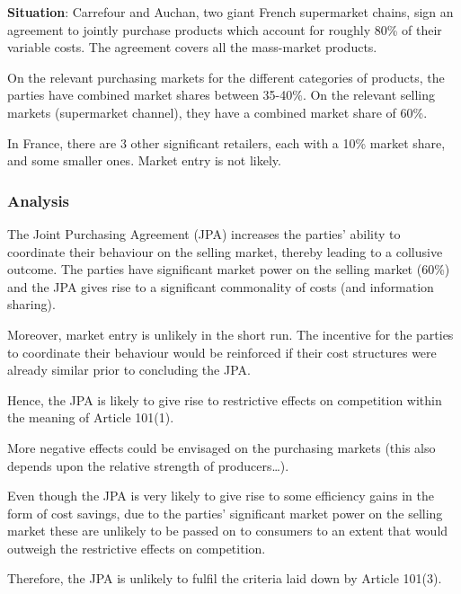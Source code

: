             \textbf{Situation}:  
            Carrefour and Auchan, two giant French supermarket chains, sign an agreement to jointly purchase products which account for roughly 80\% of their variable costs. The agreement covers all the mass-market products.
            
            On the relevant purchasing markets for the different categories of products, the parties have combined market shares between 35-40\%. On the relevant selling markets (supermarket channel), they have a combined market share of 60\%.
            
            In France, there are 3 other significant retailers, each with a 10\% market share, and some smaller ones. Market entry is not likely.

            \subsubsection{Analysis}

                The Joint Purchasing Agreement (JPA) increases the parties’ ability to coordinate their behaviour on the selling market, thereby leading to a collusive outcome. The parties have significant market power on the selling market (60\%) and the JPA gives rise to a significant commonality of costs (and information sharing).

                Moreover, market entry is unlikely in the short run. The incentive for the parties to coordinate their behaviour would be reinforced if their cost structures were already similar prior to concluding the JPA.
                
                Hence, the JPA is likely to give rise to restrictive effects on competition within the meaning of Article 101(1).
                
                More negative effects could be envisaged on the purchasing markets (this also depends upon the relative strength of producers\ldots).
                
                Even though the JPA is very likely to give rise to some efficiency gains in the form of cost savings, due to the parties’ significant market power on the selling market these are unlikely to be passed on to consumers to an extent that would outweigh the restrictive effects on competition.
                
                Therefore, the JPA is unlikely to fulfil the criteria laid down by Article 101(3).
                
